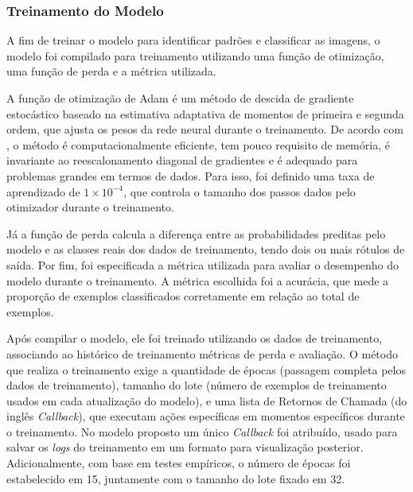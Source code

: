 
\subsubsection{\esp Treinamento do Modelo} \label{treinamento}

A fim de treinar o modelo para identificar padrões e classificar as imagens, o modelo foi compilado para treinamento utilizando uma função de otimização, uma função de perda e a métrica utilizada. 

A função de otimização de Adam é um método de descida de gradiente estocástico baseado na estimativa adaptativa de momentos de primeira e segunda ordem, que ajusta os pesos da rede neural durante o treinamento. De acordo com , o método é computacionalmente eficiente, tem pouco requisito de memória, é invariante ao reescalonamento diagonal de gradientes e é adequado para problemas grandes em termos de dados. Para isso, foi definido uma taxa de aprendizado de \ensuremath{1 \times 10^{-4}}, que controla o tamanho dos passos dados pelo otimizador durante o treinamento.

Já a função de perda calcula a diferença entre as probabilidades preditas pelo modelo e as classes reais dos dados de treinamento, tendo dois ou mais rótulos de saída. Por fim, foi especificada a métrica utilizada para avaliar o desempenho do modelo durante o treinamento. A métrica escolhida foi a acurácia, que mede a proporção de exemplos classificados corretamente em relação ao total de exemplos. 

Após compilar o modelo, ele foi treinado utilizando os dados de treinamento, associando ao histórico de treinamento métricas de perda e avaliação. O método que realiza o treinamento exige a quantidade de épocas (passagem completa pelos dados de treinamento), tamanho do lote (número de exemplos de treinamento usados em cada atualização do modelo), e uma lista de Retornos de Chamada (do inglês \textit{Callback}), que executam ações específicas em momentos específicos durante o treinamento. No modelo proposto um único \textit{Callback} foi atribuído, usado para salvar os \textit{logs} do treinamento em um formato para visualização posterior. Adicionalmente, com base em testes empíricos, o número de épocas foi estabelecido em 15, juntamente com o tamanho do lote fixado em 32.



